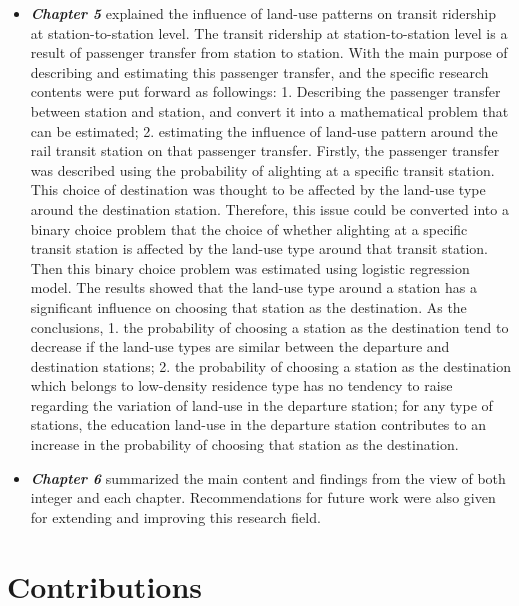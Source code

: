 \begin{itemize}
	\item \emph{\textbf{Chapter 5}} explained the influence of land-use patterns on transit ridership at station-to-station level. The transit ridership at station-to-station level is a result of passenger transfer from station to station. With the main purpose of describing and estimating this passenger transfer, and the specific research contents were put forward as followings: 1. Describing the passenger transfer between station and station, and convert it into a mathematical problem that can be estimated; 2. estimating the influence of land-use pattern around the rail transit station on that passenger transfer. Firstly, the passenger transfer was described using the probability of alighting at a specific transit station. This choice of destination was thought to be affected by the land-use type around the destination station. Therefore, this issue could be converted into a binary choice problem that the choice of whether alighting at a specific transit station is affected by the land-use type around that transit station. Then this binary choice problem was estimated using logistic regression model. The results showed that the land-use type around a station has a significant influence on choosing that station as the destination. As the conclusions, 1. the probability of choosing a station as the destination tend to decrease if the land-use types are similar between the departure and destination stations; 2. the probability of choosing a station as the destination which belongs to low-density residence type has no tendency to raise regarding the variation of land-use in the departure station; for any type of stations, the education land-use in the departure station contributes to an increase in the probability of choosing that station as the destination.
	
	\item \emph{\textbf{Chapter 6}} summarized the main content and findings from the view of both integer and each chapter. Recommendations for future work were also given for extending and improving this research field.
\end{itemize}

\section{Contributions}

